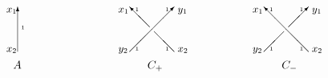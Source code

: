 \documentclass{amsart}
\theoremstyle{plain}
\theoremstyle{definition}
\theoremstyle{remark}
\numberwithin{equation}{section}
\begin{document}
\begin{figure}[ht]
$
\xymatrix{

\setlength{\unitlength}{1pt}
\begin{picture}(60,55)(-30,-15)

\put(0,0){\vector(0,1){40}}

\put(3,20){\tiny{$1$}}

\put(-10,35){\small{$x_1$}}

\put(-10,0){\small{$x_2$}}

\put(-4,-15){$A$}

\end{picture}
 && 
\setlength{\unitlength}{1pt}
\begin{picture}(60,55)(-30,-15)

\put(-20,0){\vector(1,1){40}}

\put(20,0){\line(-1,1){18}}

\put(-2,22){\vector(-1,1){18}}

\put(-15,36){\tiny{$1$}}

\put(12,36){\tiny{$1$}}

\put(-15,1){\tiny{$1$}}

\put(12,1){\tiny{$1$}}

\put(-30,35){\small{$x_1$}}

\put(-30,0){\small{$y_2$}}

\put(23,35){\small{$y_1$}}

\put(23,0){\small{$x_2$}}

\put(-4,-15){$C_+$}

\end{picture}
 && \setlength{\unitlength}{1pt}
\begin{picture}(60,55)(-30,-15)

\put(20,0){\vector(-1,1){40}}

\put(-20,0){\line(1,1){18}}

\put(2,22){\vector(1,1){18}}

\put(-15,36){\tiny{$1$}}

\put(12,36){\tiny{$1$}}

\put(-15,1){\tiny{$1$}}

\put(12,1){\tiny{$1$}}

\put(-30,35){\small{$x_1$}}

\put(-30,0){\small{$y_2$}}

\put(23,35){\small{$y_1$}}

\put(23,0){\small{$x_2$}}

\put(-4,-15){$C_-$}

\end{picture}
 
}
$
\caption{}\label{tangle-pieces-fig}

\end{figure}
\end{document}
